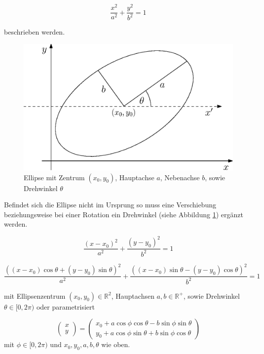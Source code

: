 \begin{equation} \label{eq:ellipseNoRotNoTrans}
\frac{x^2}{a^2} + \frac{y^2}{b^2} = 1
\end{equation} 

beschrieben werden.

\begin{figure}[!htb]
	\centering
	\includegraphics[scale=.7]{images/ellipse.eps}
	\caption{Ellipse mit Zentrum $(x_0, y_0)$, Hauptachse $a$, Nebenachse $b$, sowie Drehwinkel $\theta$}
	\label{fig:ellipse}
\end{figure}

Befindet sich die Ellipse nicht im Ursprung so muss eine Verschiebung beziehungsweise bei einer Rotation ein Drehwinkel (siehe Abbildung \ref{fig:ellipse}) ergänzt werden. 

\begin{equation} \label{eq:ellipseNoRotTrans}
\frac{\left(x-x_0\right)^2}{a^2} + \frac{\left(y-y_0\right)^2}{b^2} = 1
\end{equation} 

\begin{equation} \label{eq:ellipseRotTrans}
\frac{((x - x_0)\cos\theta + (y - y_0)\sin\theta)^2}{a^2} + \frac{((x - x_0)\sin\theta - (y - y_0)\cos\theta)^2}{b^2} = 1
\end{equation} 

mit Ellipsenzentrum $(x_0,y_0)\in\mathbb{R}^2$, Hauptachsen $a,b\in\mathbb{R}^+$, sowie Drehwinkel $\theta \in [0,2\pi)$ oder parametrisiert

\begin{equation} \label{eq:ellipseRotTransParam}
\begin{pmatrix}x \\ y\end{pmatrix} = \begin{pmatrix}x_0 + a\cos\phi\cos\theta - b\sin\phi\sin\theta \\ 
y_0 + a\cos\phi\sin\theta + b\sin\phi\cos\theta\end{pmatrix}
\end{equation}
mit $\phi \in [0, 2\pi)$ und $x_0, y_0, a,b, \theta$ wie oben.

